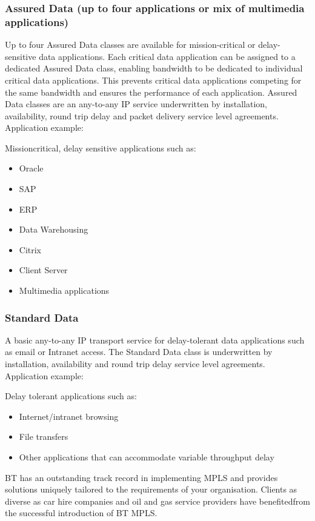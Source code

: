 \subsubsection{Assured Data (up to four applications or mix of multimedia applications)}
Up to four Assured Data classes are available for mission-critical or delay-sensitive data applications. Each critical data application can be assigned to a dedicated Assured Data class, enabling bandwidth to be dedicated to individual critical data applications. This prevents critical data applications competing for the same bandwidth and ensures the performance of each application. Assured Data classes are an any-to-any IP service underwritten by installation, availability, round trip delay and packet delivery service level agreements.
Application example:

Missioncritical, delay sensitive applications such as:
\begin{itemize}
\item Oracle
\item SAP
\item ERP
\item Data Warehousing
\item Citrix
\item Client Server
\item Multimedia applications
\end{itemize}

\subsubsection{Standard Data}
A basic any-to-any IP transport service for delay-tolerant data applications such as email or Intranet access. The Standard Data class is underwritten by installation, availability and round trip delay service level agreements.
Application example:

Delay tolerant applications such as:
\begin{itemize}
\item Internet/intranet browsing
\item File transfers
\item Other applications that can accommodate variable throughput delay
\end{itemize}


BT has an outstanding track record in implementing MPLS and provides solutions uniquely tailored to the requirements of your organisation. Clients as diverse as car hire companies and oil and gas service providers have benefitedfrom the successful introduction of BT MPLS.

